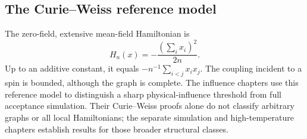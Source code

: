\subsection{The Curie--Weiss reference model}

The zero-field, extensive mean-field Hamiltonian is
\[
 H_n(x)=-\frac{(\sum_i x_i)^2}{2n}.
\]
Up to an additive constant, it equals $-n^{-1}\sum_{i<j}x_ix_j$.
The coupling incident to a spin is bounded, although the graph is complete.
The influence chapters use this reference model to distinguish a sharp
physical-influence threshold from full acceptance simulation. Their
Curie--Weiss proofs alone do not classify arbitrary graphs or all local
Hamiltonians; the separate simulation and high-temperature chapters
establish results for those broader structural classes.
